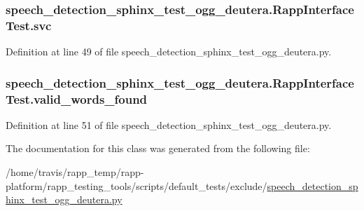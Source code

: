\hypertarget{classspeech__detection__sphinx__test__ogg__deutera_1_1RappInterfaceTest_ae4e2ddb919628d8af6823a57b204a239}{
\subsubsection[{svc}]{\setlength{\rightskip}{0pt plus 5cm}speech\-\_\-detection\-\_\-sphinx\-\_\-test\-\_\-ogg\-\_\-deutera.\-Rapp\-Interface\-Test.\-svc}}\label{classspeech__detection__sphinx__test__ogg__deutera_1_1RappInterfaceTest_ae4e2ddb919628d8af6823a57b204a239}


Definition at line 49 of file speech\-\_\-detection\-\_\-sphinx\-\_\-test\-\_\-ogg\-\_\-deutera.\-py.

\hypertarget{classspeech__detection__sphinx__test__ogg__deutera_1_1RappInterfaceTest_ad94b8f879ac28451caecb43b85a87f26}{
\subsubsection[{valid\-\_\-words\-\_\-found}]{\setlength{\rightskip}{0pt plus 5cm}speech\-\_\-detection\-\_\-sphinx\-\_\-test\-\_\-ogg\-\_\-deutera.\-Rapp\-Interface\-Test.\-valid\-\_\-words\-\_\-found}}\label{classspeech__detection__sphinx__test__ogg__deutera_1_1RappInterfaceTest_ad94b8f879ac28451caecb43b85a87f26}


Definition at line 51 of file speech\-\_\-detection\-\_\-sphinx\-\_\-test\-\_\-ogg\-\_\-deutera.\-py.



The documentation for this class was generated from the following file\-:\begin{DoxyCompactItemize}
\item 
/home/travis/rapp\-\_\-temp/rapp-\/platform/rapp\-\_\-testing\-\_\-tools/scripts/default\-\_\-tests/exclude/\hyperlink{speech__detection__sphinx__test__ogg__deutera_8py}{speech\-\_\-detection\-\_\-sphinx\-\_\-test\-\_\-ogg\-\_\-deutera.\-py}\end{DoxyCompactItemize}
